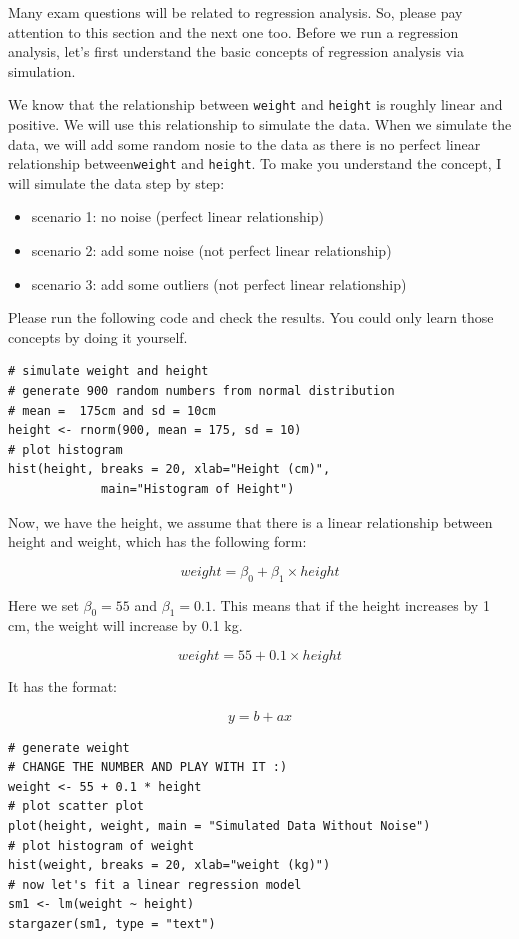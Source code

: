 \documentclass[11pt]{article}
\theoremstyle{definition}
\providecommand{\tightlist}{%
\setlength{\itemsep}{0pt}\setlength{\parskip}{0pt}}
\begin{document}
Many exam questions will be related to regression analysis. 
So, please pay attention to this section and the next one too. Before we run a regression analysis, 
let's first understand the basic concepts of regression analysis via simulation.

We know that the relationship between \texttt{weight} and \texttt{height} is 
roughly linear and positive. We will use this relationship to simulate the 
data. When we simulate the data, we will add some
random nosie to the data as there is no perfect linear relationship
between\texttt{weight} and \texttt{height}.
To make you understand the concept, I will simulate the data step by step: 

\begin{itemize}
\tightlist
\item scenario 1: no noise (perfect linear relationship)
\item scenario 2: add some noise (not perfect linear relationship)
\item scenario 3: add some outliers (not perfect linear relationship)
\end{itemize}

Please run the following code and check the results. You could only learn 
those concepts by doing it yourself.

\begin{lstlisting}
# simulate weight and height
# generate 900 random numbers from normal distribution
# mean =  175cm and sd = 10cm
height <- rnorm(900, mean = 175, sd = 10)
# plot histogram
hist(height, breaks = 20, xlab="Height (cm)",
             main="Histogram of Height")
\end{lstlisting}


Now, we have the height, we assume that there is a linear relationship between 
height and weight, which has the following form:

$$
weight = \beta_0 + \beta_1 \times height
$$

Here we set $\beta_0 = 55$ and $\beta_1 = 0.1$. This means that if the height increases by 1 cm, the weight will increase by 0.1 kg.

$$
weight = 55 + 0.1 \times height
$$

It has the format:

$$
y = b + ax
$$

\begin{lstlisting}
# generate weight
# CHANGE THE NUMBER AND PLAY WITH IT :) 
weight <- 55 + 0.1 * height
# plot scatter plot
plot(height, weight, main = "Simulated Data Without Noise")
# plot histogram of weight
hist(weight, breaks = 20, xlab="weight (kg)")
# now let's fit a linear regression model
sm1 <- lm(weight ~ height)
stargazer(sm1, type = "text")
\end{lstlisting}
\end{document}

